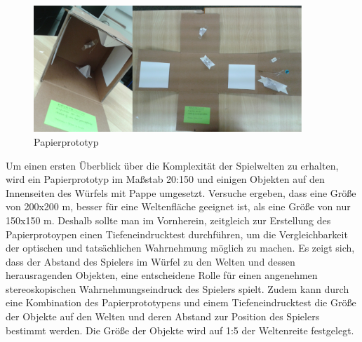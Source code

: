 
\begin{figure}[!htbp]%
	\centering
		\includegraphics[width=0.9\textwidth]{images/Prototyp}
	\caption{Papierprototyp}
	\label{fig:Papierprototyp}
\end{figure}

Um einen ersten Überblick über die Komplexität der Spielwelten zu erhalten, wird ein Papierprototyp im Maßstab 20:150 und einigen Objekten auf den Innenseiten des Würfels mit Pappe umgesetzt. Versuche ergeben, dass eine Größe von 200x200 m, besser für eine Weltenfläche geeignet ist, als eine Größe von nur 150x150 m. Deshalb sollte man im Vornherein, zeitgleich zur Erstellung des Papierprotoypen einen Tiefeneindrucktest durchführen, um die Vergleichbarkeit der optischen und tatsächlichen Wahrnehmung möglich zu machen. Es zeigt sich, dass der Abstand des Spielers im Würfel zu den Welten und dessen herausragenden Objekten, eine entscheidene Rolle für einen angenehmen stereoskopischen Wahrnehmungseindruck des Spielers spielt. Zudem kann durch eine Kombination des Papierprototypens und einem Tiefeneindrucktest die Größe der Objekte auf den Welten und deren Abstand zur Position des Spielers bestimmt werden. Die Größe der Objekte wird auf 1:5 der Weltenreite festgelegt.